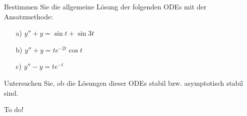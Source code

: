 \begin{exercise}
  Bestimmen Sie die allgemeine Lösung der folgenden ODEs mit der Ansatzmethode:
  \begin{itemize}
    \item[a)] $y'' + y = \sin t +\sin 3t $
    \item[b)] $y'' + y = t e^{-2t} \cos t$
    \item[c)] $y'' - y = t e^{-t}$
  \end{itemize}
  Untersuchen Sie, ob die Lösungen dieser ODEs stabil bzw. asymptotisch stabil sind.
\end{exercise}

\begin{solution}
  To do!
\end{solution}
